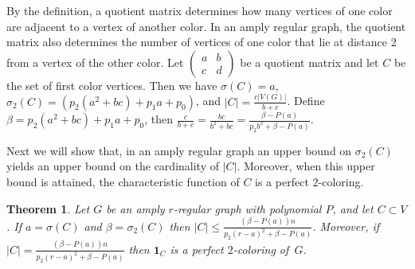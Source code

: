 \documentclass[11pt]{article}
\newtheorem{theorem}{Theorem}[section]
\theoremstyle{definition}
\begin{document}
By the definition,  a  quotient matrix
determines how many vertices of one color are  adjacent to a vertex of another color.
In an amply regular graph, the quotient matrix also determines the number of vertices of one color that lie at distance $2$ from a vertex of the other color.
Let $\begin{pmatrix}
a & b\\
c & d
\end{pmatrix}$  be a quotient matrix and 
let $C$ be  the set of first
color vertices. Then we have $\sigma(C)=a$,
$\sigma_2(C)=(p_2(a^2+bc)+p_1a+p_0)$, and
$|C|=\frac{c|V(G)|}{b+c}$. Define
$\beta=p_2(a^2+bc)+p_1a+p_0$, then
$\frac{c}{b+c}=\frac{bc}{b^2+bc}=\frac{\beta-P(a)}{p_2b^2+\beta-P(a)}$.

Next we will show
that, in an amply regular graph an upper bound on  $\sigma_2(C)$ yields  an upper bound on the cardinality of $|C|$. Moreover, when this
upper bound  is attained,  the characteristic
function of  $C$ is a perfect $2$-coloring.


\begin{theorem}\label{thEPPC}
Let $G$ be an amply $r$-regular graph with polynomial
$P$, and let $C\subset V$. If  $a=\sigma(C)$ and $\beta=\sigma_2(C)$
then $|C|\leq \frac{(\beta-P(a))n}{p_2(r-a)^2+\beta-P(a)} $.
Moreover, if $|C|= \frac{(\beta-P(a))n}{p_2(r-a)^2+\beta-P(a)} $
then
 ${\mathbf{1}}_C$ is a perfect $2$-coloring of~$G$.\end{theorem}
\end{document}
